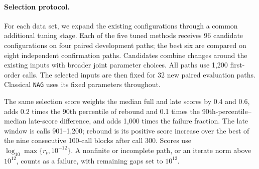 \documentclass{article}
\begin{document}
\paragraph{Selection protocol.}
For each data set, we expand the existing configurations through a
common additional tuning stage. Each of the five tuned methods receives
96 candidate configurations on four paired development paths; the best
six are compared on eight independent confirmation paths. Candidates
combine changes around the existing inputs with broader joint parameter
choices. All paths use 1,200 first-order calls. The selected inputs are
then fixed for 32 new paired evaluation paths. Classical \texttt{NAG}
uses its fixed parameters throughout.

The same selection score weights the median full and late scores by
0.4 and 0.6, adds 0.2 times the 90th percentile of rebound and 0.1 times
the 90th-percentile--median late-score difference, and adds 1,000 times
the failure fraction. The late window is calls 901--1,200;
rebound is its positive score increase over the best of the nine
consecutive 100-call blocks after call 300. Scores use
\(\log_{10}\max\{r_t,10^{-12}\}\).
A nonfinite or incomplete path, or an iterate norm above \(10^{12}\),
counts as a failure, with remaining gaps set to \(10^{12}\).
\end{document}
